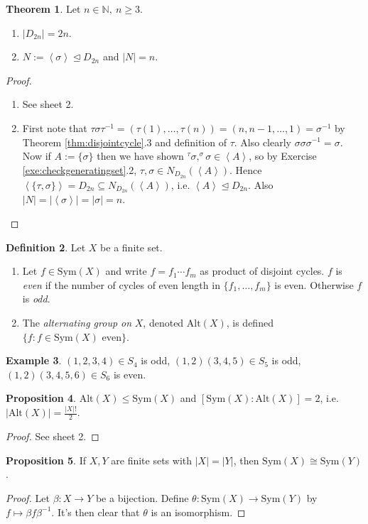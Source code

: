 \documentclass[a4paper]{article}
\newcommand{\la}{\left\langle}
\newcommand{\ra}{\right\rangle}
\newcommand{\N}{\mathbb{N}}
\newcommand{\Sym}{\text{Sym}}
\newcommand{\Alt}{\text{Alt}}
\theoremstyle{definition}
\newtheorem{defn}{Definition}[subsection]
\newtheorem{prop}[defn]{Proposition}
\newtheorem{thm}[defn]{Theorem}
\newtheorem{example}[defn]{Example}
\begin{document}
\begin{thm}
Let $n\in\N,\ n\geq 3$.
\begin{enumerate}
\item $|D_{2n}|=2n$.
\item $N:=\la\sigma\ra \unlhd D_{2n}$ and $|N|=n$.
\end{enumerate}
\end{thm}
\begin{proof}
\begin{enumerate}
\item See sheet 2.
\item First note that $\tau\sigma\tau^{-1}=(\tau(1),\ldots,\tau(n))=(n,n-1,\ldots,1)=\sigma^{-1}$ by Theorem \ref{thm:disjointcycle}.3 and definition of $\tau$. Also clearly $\sigma\sigma\sigma^{-1}=\sigma$. Now if $A:=\{\sigma\}$ then we have shown $^\tau \sigma,^\sigma \sigma \in\la A\ra$, so by Exercise \ref{exe:checkgeneratingset}.2, $\tau,\sigma\in N_{D_{2n}}(\la A\ra)$. Hence $\la\{\tau,\sigma\}\ra=D_{2n}\subseteq N_{D_{2n}}(\la A\ra)$, i.e. $\la A\ra \unlhd D_{2n}$. Also $|N|=|\la \sigma\ra|=|\sigma|=n$.
\end{enumerate}
\end{proof}

\begin{defn}
Let $X$ be a finite set.
\begin{enumerate}
\item Let $f\in\Sym(X)$ and write $f=f_1\cdots f_m$ as product of disjoint cycles. $f$ is \textit{even} if the number of cycles of even length in $\{f_1,\ldots,f_m\}$ is even. Otherwise $f$ is \textit{odd}.
\item The \textit{alternating group on} $X$, denoted $\Alt(X)$, is defined $\{f:f\in\Sym(X)\text{ even}\}$.
\end{enumerate}
\end{defn}
\begin{example}
$(1,2,3,4)\in S_4$ is odd, $(1,2)(3,4,5)\in S_5$ is odd, $(1,2)(3,4,5,6)\in S_6$ is even.
\end{example}

\begin{prop}
$\Alt(X)\leq \Sym(X)$ and $[\Sym(X):\Alt(X)]=2$, i.e. $|\Alt(X)|=\frac{|X|!}{2}$.
\end{prop}
\begin{proof}
See sheet 2.
\end{proof}

\begin{prop}
If $X,Y$ are finite sets with $|X|=|Y|$, then $\Sym(X)\cong\Sym(Y)$.
\end{prop}
\begin{proof}
Let $\beta:X\rightarrow Y$ be a bijection. Define $\theta:\Sym(X)\rightarrow\Sym(Y)$ by $f\mapsto \beta f\beta^{-1}$. It's then clear that $\theta$ is an isomorphism.
\end{proof}
\end{document}
